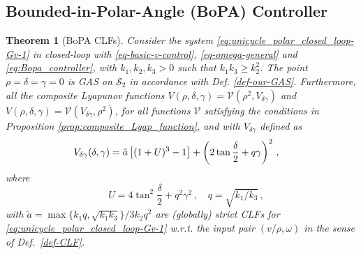 \documentclass[journal,twoside,web]{ieeecolor}
\newtheorem{theorem}{Theorem}
\theoremstyle{definition}
\begin{document}
\subsection{Bounded-in-Polar-Angle (BoPA) Controller}

\begin{theorem}[BoPA CLFs] 
\label{thm:unicycle_CLF_BoPA}
Consider the system \eqref{eq:unicycle_polar_closed_loop-Gv-1} in closed-loop with \eqref{eq-basic-v-control}, \eqref{eq-omega-general} and \eqref{eq:Bopa_controller}, with  $k_1, k_2, k_3 > 0$ such that  
$k_1 k_3\geq k_2^2$.
The point $\rho = \delta = \gamma = 0$ is GAS on $\mathcal{S}_2$ in accordance with Def. \ref{def-our-GAS}.
Furthermore, all the composite Lyapunov functions $V(\rho, \delta, \gamma) = \mathcal{V}(\rho^2, V_{\delta \gamma})$ and $V(\rho, \delta, \gamma) = \mathcal{V}(V_{\delta \gamma},\rho^2)$, for all functions $\mathcal{V}$ satisfying the conditions in Proposition \ref{prop:composite_Lyap_function}, and with $V_{\delta \gamma}$ defined as
\begin{equation}
\label{eq:CLF_BoPa_delta_gamma}
\hspace*{-0.35cm}
V_{\delta \gamma}(\delta,\gamma) =  \tilde{a} \left[ (1+U)^3 -1\right]
+   \left (2\tan\frac{\delta}{2} + q \gamma \right)^2\,,
\end{equation}
where
\begin{equation}
\quad U= 4\tan^2 \frac{\delta}{2}+ q^2 \gamma^2\,,  \quad q = \sqrt{k_1 / k_3} \,, \label{eq:U_Bopa}
\end{equation}
with  $ \tilde{a} = \max\{k_1 q, \sqrt{k_1 k_3}\} / 3k_2 q^2$ 
are (globally) strict CLFs for \eqref{eq:unicycle_polar_closed_loop-Gv-1} w.r.t. the input pair $(v/\rho,\omega)$ in the sense of Def.~\ref{def-CLF}. 
\end{theorem}
\raggedbottom
\end{document}
